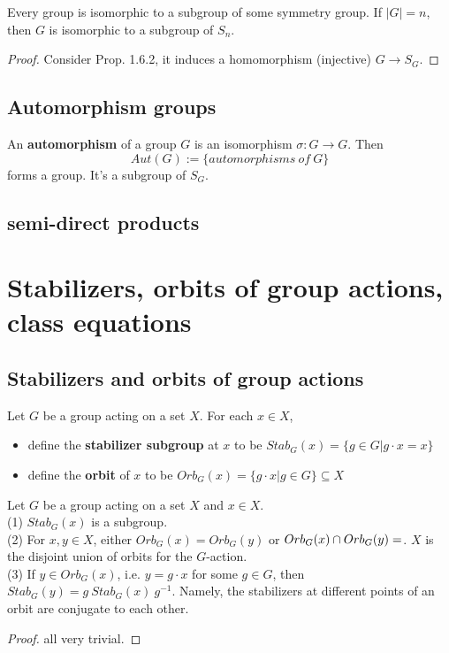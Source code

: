 \documentclass[11pt,fleqn]{book} %
\begin{document}
\begin{CJK}{UTF8}{gkai}
\begin{theorem}
	[Cayley] Every group is isomorphic to a subgroup of some symmetry group. If $|G| = n$, then $G$ is isomorphic to a subgroup of $S_n$.
\end{theorem}
\begin{proof}
	Consider Prop. 1.6.2, it induces a homomorphism (injective) $G \to S_G$.
\end{proof}

\subsection{Automorphism groups}
\begin{definition}
	An {\bf automorphism} of a group $G$ is an isomorphism $\sigma: G \to G$. Then 
	\[Aut(G) := \{automorphisms \ of \ G\}\] 
	forms a group. It's a subgroup of $S_G$.
\end{definition}

\subsection{semi-direct products}

\section{Stabilizers, orbits of group actions, class equations}
\subsection{Stabilizers and orbits of group actions}
\begin{definition}
	Let $G$ be a group acting on a set $X$. For each $x \in X$,
	\begin{itemize}
		\item define the {\bf stabilizer subgroup} at $x$ to be $Stab_G(x)=\{g\in G| g\cdot x = x\}$
		\item define the {\bf orbit} of $x$ to be $Orb_G(x) = \{g\cdot x | g \in G\}\subseteq X$ 	
	\end{itemize}
\end{definition}

\begin{proposition}
	Let $G$ be a group acting on a set $X$ and $x\in X$. \\
	(1) $Stab_G(x)$ is a subgroup. \\
	(2) For $x,y \in X$, either $Orb_G(x) = Orb_G(y)$ or $Orb_G(x) \cap Orb_G(y) = \empty$. $X$ is the disjoint union of orbits for the $G$-action. \\
	(3) If $y \in Orb_G(x)$, i.e. $y = g\cdot x$ for some $g\in G$, then $Stab_G(y) = g \ Stab_G(x) \  g^{-1}$. Namely, the stabilizers at different points of an orbit are conjugate to each other.
\end{proposition}
\begin{proof}
	all very trivial.	
\end{proof}


\end{CJK}
\end{document}
